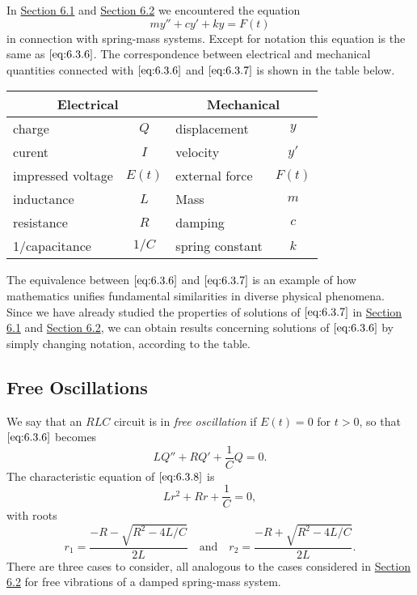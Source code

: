 \documentclass{ximera}
\begin{document}
In  \href{https://xerxes.ximera.org/differentialequations/main/springProblemsI/springProblemsI}{Section 6.1} and \href{https://xerxes.ximera.org/differentialequations/main/springProblemsI/springProblemsII}{Section 6.2} we encountered the
equation
\begin{equation} \label{eq:6.3.7}
my''+cy'+ky=F(t)
\end{equation}
in connection with spring-mass systems. Except for notation this
equation is the same as $\eqref{eq:6.3.6}$. The correspondence between
electrical and mechanical quantities connected with $\eqref{eq:6.3.6}$ and
$\eqref{eq:6.3.7}$ is shown in the table below.

\begin{center}
\begin{tabular}{|lc|lc|}\hline
\multicolumn{2}{|c|}{\bf Electrical}&
\multicolumn{2}{c|}{\bf Mechanical}\\\hline
charge& $Q$& displacement&$y$\\\hline
curent&$I$&velocity&$y'$\\\hline
impressed voltage&$E(t)$&external force&$F(t)$\\\hline
inductance&$L$&Mass&$m$\\\hline
resistance&$R$&damping&$c$\\\hline
1/capacitance&$1/C$&spring constant&$k$\\\hline
\end{tabular}
\end{center}

The equivalence between $\eqref{eq:6.3.6}$ and $\eqref{eq:6.3.7}$ is an example of how mathematics unifies fundamental similarities in diverse physical phenomena. Since we have already studied the properties of solutions of
$\eqref{eq:6.3.7}$ in \href{https://xerxes.ximera.org/differentialequations/main/springProblemsI/springProblemsI}{Section 6.1} and \href{https://xerxes.ximera.org/differentialequations/main/springProblemsI/springProblemsII}{Section 6.2}, we
can obtain results concerning solutions of $\eqref{eq:6.3.6}$ by simply changing
notation, according to the table.

\subsection*{Free Oscillations}

We say that an $RLC$ circuit is in \textit{free oscillation} if $E(t)=0$
for $t>0$, so that $\eqref{eq:6.3.6}$ becomes
\begin{equation} \label{eq:6.3.8}
LQ''+RQ'+\frac{1}{C}Q=0.
\end{equation}
The characteristic equation of $\eqref{eq:6.3.8}$ is
$$
Lr^2+Rr+\frac{1}{C}=0,
$$
with roots
\begin{equation}\label{eq:6.3.9}
r_1=\frac{-R-\sqrt{R^2-4L/C}}{2L}\quad\mbox{and}\quad r_2=
\frac{-R+\sqrt{R^2-4L/C}}{2L}.
\end{equation}
There are three cases to consider, all analogous to the cases considered in \href{https://xerxes.ximera.org/differentialequations/main/springProblemsI/springProblemsII}{Section 6.2} for free vibrations of a damped
spring-mass system.
\end{document}
